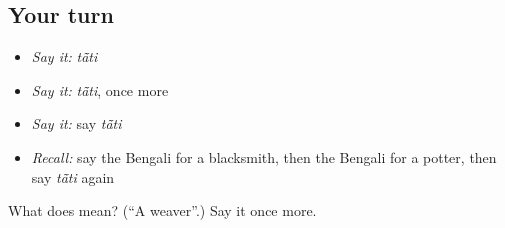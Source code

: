 \subsection*{Your turn}
\begin{itemize}
\raggedright
  \item \emph{Say it:} \emph{tā̃ti}
  \item \emph{Say it:} \emph{tā̃ti}, once more
  \item \emph{Say it:} say \emph{tā̃ti}
  \item \emph{Recall:} say the Bengali for a blacksmith, then the Bengali for a potter, then say \emph{tā̃ti} again
\end{itemize}

\begin{tcolorbox}[breakable,colback=teal!4,colframe=teal!35!black,title={Before you move on}]
What does  mean? (\textquotedblleft{}A weaver\textquotedblright{}.) Say it once more.
\end{tcolorbox}
